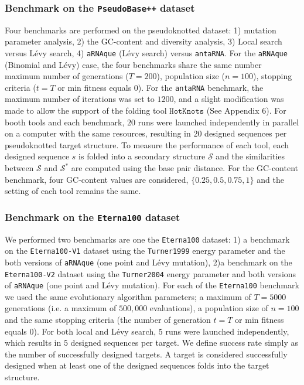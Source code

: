 \subsubsection*{Benchmark on the \texttt{PseudoBase++} dataset}
Four benchmarks are performed on the pseudoknotted dataset: 1) mutation parameter analysis, 2) the GC-content and diversity analysis, 3) Local search versus Lévy search, 4) \texttt{aRNAque} (Lévy search) versus \texttt{antaRNA}. For the \texttt{aRNAque} (Binomial and Lévy) case, the four benchmarks share the same number maximum number of generations ($T=200$), population size ($n=100$), stopping criteria ($t=T$ or min fitness equals $0$).
For the \texttt{antaRNA} benchmark, the maximum number of iterations was set to $1200$, and a slight modification was made to allow the support of the folding tool $\texttt{HotKnots}$ (See Appendix 6).  
For booth tools and each benchmark,  $20$ runs were launched independently in parallel on a computer with the same resources, resulting in $20$ designed sequences per pseudoknotted target structure. To measure the performance of each tool, each designed sequence $s$ is folded into a secondary structure $\mathcal{S}$ and the similarities between $\mathcal{S}$ and $\mathcal{S}^*$ are computed using the base pair distance. 
For the GC-content benchmark, four GC-content values are considered, $\{0.25, 0.5, 0.75,1\}$ and the setting of each tool remains the same.
\subsubsection*{Benchmark on the \texttt{Eterna100} dataset}
We performed two benchmarks are one the \texttt{Eterna100} dataset: 1) a benchmark on the \texttt{Eterna100-V1} dataset using the \texttt{Turner1999} energy parameter and the both versions of \texttt{aRNAque} (one point and Lévy mutation), 2)a benchmark on the \texttt{Eterna100-V2} dataset using the \texttt{Turner2004} energy parameter and both versions of \texttt{aRNAque} (one point and Lévy mutation).
For each of the \texttt{Eterna100} benchmark we used the same evolutionary algorithm parameters; a maximum of $T=5000$ generations (i.e. a maximum of  $500,000$ evaluations), a population size of $n=100$ and the same stopping criteria (the number of generation $t=T$ or min fitness equals $0$). For both local and Lévy search, $5$ runs were launched independently, which results in $5$ designed sequences per target. We define success rate simply as the number of successfully designed targets. A target is considered successfully designed when at least one of the designed sequences folds into the target structure. 


